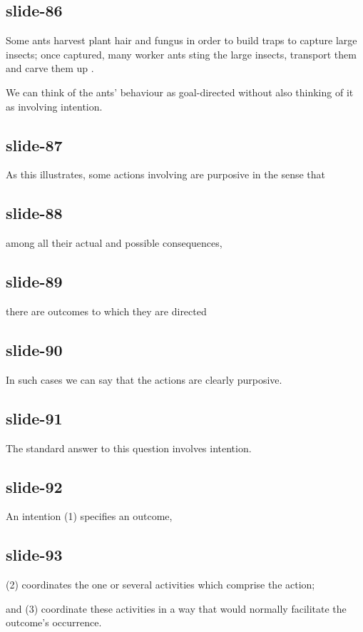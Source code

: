 \documentclass[12pt,\papersize]{extarticle}
\begin{document}
\subsection{slide-86}
Some ants harvest plant hair and fungus in order to build traps to capture large insects;
once captured, many worker ants sting the large insects, transport them and carve them up
\citep{Dejean:2005vb}.

We can think of the ants’ behaviour as goal-directed
without also thinking of it as involving intention.

\subsection{slide-87}
As this illustrates,
some actions involving are purposive in the sense that

\subsection{slide-88}
among all their actual and possible consequences,

\subsection{slide-89}
there are outcomes to which they are directed

\subsection{slide-90}
In such cases we can say that the actions are clearly purposive.

\subsection{slide-91}
The standard answer to this question involves intention.

\subsection{slide-92}
An intention (1) specifies an outcome,

\subsection{slide-93}
(2) coordinates the one or several activities which comprise the action;

and (3) coordinate these activities in a way that would normally facilitate the outcome’s occurrence.
\end{document}
